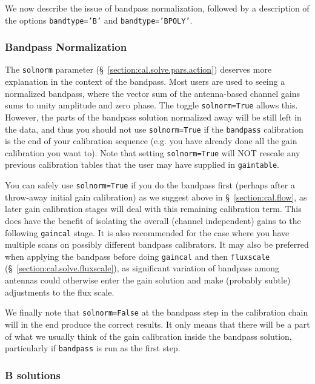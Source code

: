 We now describe the issue of bandpass normalization, followed by
a description of the options {\tt bandtype='B'} and {\tt bandtype='BPOLY'}.

\subsubsection{Bandpass Normalization}
\label{section:cal.solve.band.solnorm}

The {\tt solnorm} parameter (\S~\ref{section:cal.solve.pars.action})
deserves more explanation in the context of the bandpass.  Most users
are used to seeing a normalized bandpass, where the vector sum of the
antenna-based channel gains sums to unity amplitude and zero phase.
The toggle {\tt solnorm=True} allows this.  However, the parts of the
bandpass solution normalized away will be still left in the data,
and thus you should not use {\tt solnorm=True} if the {\tt bandpass}
calibration is the end of your calibration sequence (e.g. you have
already done all the gain calibration you want to).  Note that
setting {\tt solnorm=True} will NOT rescale any previous calibration
tables that the user may have supplied in {\tt gaintable}.

You can safely use {\tt solnorm=True} if you do the bandpass first
(perhaps after a throw-away initial gain calibration) as we suggest above in
\S~\ref{section:cal.flow}, as later gain calibration stages will deal with this
remaining calibration term.  This does have the benefit of isolating
the overall (channel independent) gains to the following {\tt gaincal}
stage.  It is also recommended for the case where you have multiple
scans on possibly different bandpass calibrators.  It may also be 
preferred when applying the bandpass before doing {\tt gaincal} and 
then {\tt fluxscale} (\S~\ref{section:cal.solve.fluxscale}), 
as significant variation of bandpass among antennas could otherwise 
enter the gain solution and make (probably subtle) adjustments to the
flux scale.

We finally note that {\tt solnorm=False} at the bandpass step in the
calibration chain will in the end produce the correct results.  It
only means that there will be a part of what we usually think of the
gain calibration inside the bandpass solution, particularly if
{\tt bandpass} is run as the first step.

\subsubsection{B solutions}
\label{section:cal.solve.band.b}

